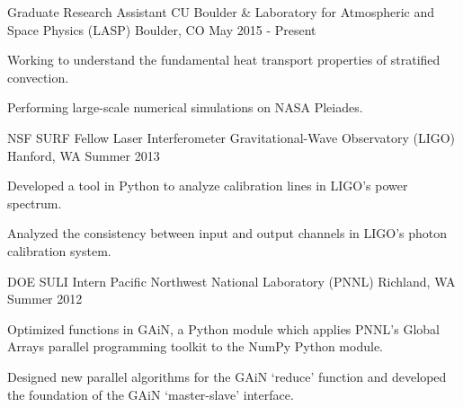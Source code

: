 

\begin{cventries}

  \cventry
    {Graduate Research Assistant} %
    {CU Boulder \& Laboratory for Atmospheric and Space Physics (LASP)} %
    {Boulder, CO} %
    {May 2015 - Present} %
    {
      \begin{cvitems} %
	  	\item {Working to understand the fundamental heat transport properties of stratified convection. }
        \item {Performing large-scale numerical simulations on NASA Pleiades.}
      \end{cvitems}
    }

  \cventry
    {NSF SURF Fellow} %
    {Laser Interferometer Gravitational-Wave Observatory (LIGO)} %
    {Hanford, WA} %
    {Summer 2013} %
    {
      \begin{cvitems} %
        \item {Developed a tool in Python to analyze calibration lines in LIGO's power spectrum.}
        \item {Analyzed the consistency between input and output channels in LIGO's photon calibration system.}
      \end{cvitems}
    }

  \cventry
    {DOE SULI Intern} %
    {Pacific Northwest National Laboratory (PNNL)} %
    {Richland, WA} %
    {Summer 2012} %
    {
      \begin{cvitems} %
        \item {Optimized functions in GAiN, a Python module which applies PNNL’s Global Arrays parallel
        programming toolkit to the NumPy Python module.}
        \item {Designed new parallel algorithms for the GAiN `reduce' function and developed the foundation of the GAiN `master-slave' interface.}
      \end{cvitems} 
    }


\end{cventries}
